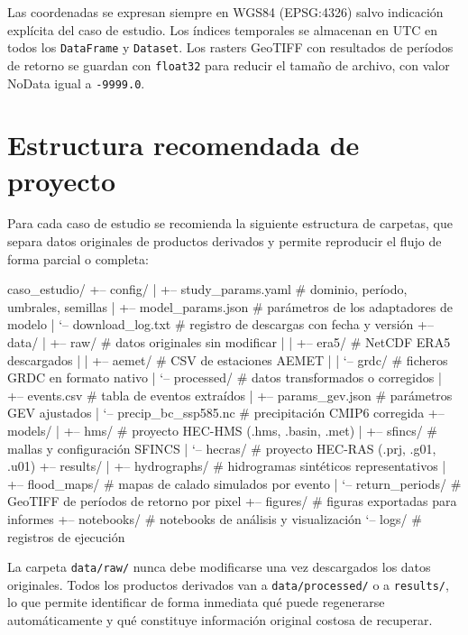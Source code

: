 Las coordenadas se expresan siempre en WGS84 (EPSG:4326) salvo indicación explícita del caso de estudio. Los índices temporales se almacenan en UTC en todos los \texttt{DataFrame} y \texttt{Dataset}. Los rasters GeoTIFF con resultados de períodos de retorno se guardan con \texttt{float32} para reducir el tamaño de archivo, con valor NoData igual a \texttt{-9999.0}.

\section{Estructura recomendada de proyecto}

Para cada caso de estudio se recomienda la siguiente estructura de carpetas, que separa datos originales de productos derivados y permite reproducir el flujo de forma parcial o completa:

{\footnotesize
\begin{codeblock}
caso_estudio/
+-- config/
|   +-- study_params.yaml      # dominio, período, umbrales, semillas
|   +-- model_params.json      # parámetros de los adaptadores de modelo
|   `-- download_log.txt       # registro de descargas con fecha y versión
+-- data/
|   +-- raw/                   # datos originales sin modificar
|   |   +-- era5/              # NetCDF ERA5 descargados
|   |   +-- aemet/             # CSV de estaciones AEMET
|   |   `-- grdc/              # ficheros GRDC en formato nativo
|   `-- processed/             # datos transformados o corregidos
|       +-- events.csv         # tabla de eventos extraídos
|       +-- params_gev.json    # parámetros GEV ajustados
|       `-- precip_bc_ssp585.nc # precipitación CMIP6 corregida
+-- models/
|   +-- hms/                   # proyecto HEC-HMS (.hms, .basin, .met)
|   +-- sfincs/                # mallas y configuración SFINCS
|   `-- hecras/                # proyecto HEC-RAS (.prj, .g01, .u01)
+-- results/
|   +-- hydrographs/           # hidrogramas sintéticos representativos
|   +-- flood_maps/            # mapas de calado simulados por evento
|   `-- return_periods/        # GeoTIFF de períodos de retorno por pixel
+-- figures/                   # figuras exportadas para informes
+-- notebooks/                 # notebooks de análisis y visualización
`-- logs/                      # registros de ejecución
\end{codeblock}
}

La carpeta \texttt{data/raw/} nunca debe modificarse una vez descargados los datos originales. Todos los productos derivados van a \texttt{data/processed/} o a \texttt{results/}, lo que permite identificar de forma inmediata qué puede regenerarse automáticamente y qué constituye información original costosa de recuperar.

